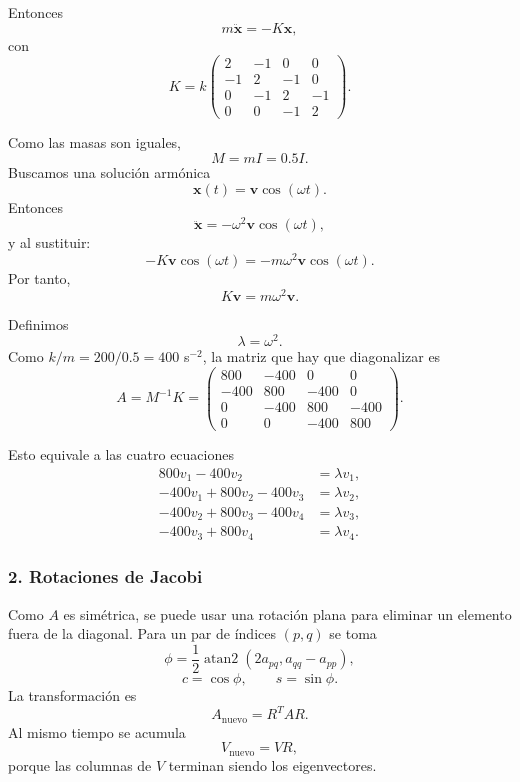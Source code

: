 \documentclass[11pt,a4paper]{article}
\begin{document}
Entonces
\begin{equation}
m\ddot{\mathbf x}=-K\mathbf x,
\end{equation}
con
\begin{equation}
K=k
\begin{pmatrix}
2&-1&0&0\\
-1&2&-1&0\\
0&-1&2&-1\\
0&0&-1&2
\end{pmatrix}.
\end{equation}

Como las masas son iguales,
\[
M=mI=0.5I.
\]
Buscamos una solución armónica
\[
\mathbf x(t)=\mathbf v\cos(\omega t).
\]
Entonces
\[
\ddot{\mathbf x}=-\omega^2\mathbf v\cos(\omega t),
\]
y al sustituir:
\[
-K\mathbf v\cos(\omega t)=-m\omega^2\mathbf v\cos(\omega t).
\]
Por tanto,
\begin{equation}
K\mathbf v=m\omega^2\mathbf v.
\end{equation}

Definimos
\[
\lambda=\omega^2.
\]
Como $k/m=200/0.5=400$ s$^{-2}$, la matriz que hay que diagonalizar es
\begin{equation}
\boxed{
A=M^{-1}K=
\begin{pmatrix}
800&-400&0&0\\
-400&800&-400&0\\
0&-400&800&-400\\
0&0&-400&800
\end{pmatrix}.}
\end{equation}

Esto equivale a las cuatro ecuaciones
\begin{align}
800v_1-400v_2&=\lambda v_1,\\
-400v_1+800v_2-400v_3&=\lambda v_2,\\
-400v_2+800v_3-400v_4&=\lambda v_3,\\
-400v_3+800v_4&=\lambda v_4.
\end{align}

\subsubsection*{2. Rotaciones de Jacobi}

Como $A$ es simétrica, se puede usar una rotación plana para eliminar un elemento fuera de la diagonal. Para un par de índices $(p,q)$ se toma
\begin{equation}
\phi=\frac12\operatorname{atan2}(2a_{pq},a_{qq}-a_{pp}),
\end{equation}
\[
c=\cos\phi,
\qquad
s=\sin\phi.
\]
La transformación es
\[
A_{\text{nuevo}}=R^TAR.
\]
Al mismo tiempo se acumula
\[
V_{\text{nuevo}}=VR,
\]
porque las columnas de $V$ terminan siendo los eigenvectores.
\end{document}

